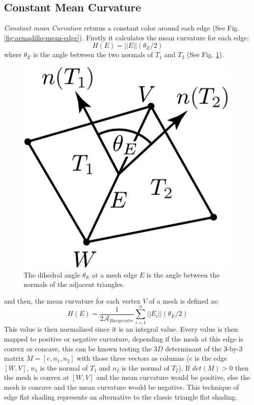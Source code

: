 \subsection{Constant Mean Curvature}
\textit{Constant mean Curvature} returns a constant color around each edge (See Fig. \ref{fig:armadillo-mean-edge}). Firstly it calculates the mean curvature for each edge:
$$H(E) = || E|| (\theta_E /2)$$
where $\theta_E$ is the angle between the two normals of $T_1$ and $T_2$ (See Fig. \ref{fig:mean-edge}).
\begin{figure}[!h]
    \centering
    \includegraphics[scale=0.6]{images/mean-edge-theta.png}
    \caption{The dihedral angle $\theta_E$ at a mesh edge $E$ is the angle between the normals of the adjacent triangles. \cite{geometryprocessing}}\label{fig:mean-edge}
\end{figure}
and then, the mean curvature for each vertex $V$ of a mesh is defined as:
$$H(E) = \frac{1}{2\mathcal{A}_{Barycentre}} \sum_{i = 1}^n ||E_i||(\theta_E/2)$$
This value is then normalized since it is an integral value. Every value is then mapped to positive or negative curvature, depending if the mesh at this edge is convex or concave, this can be known testing the $3D$ determinant of the 3-by-3 matrix $M = [e, n_1, n_2]$ with those three vectors as
columns ($e$ is the edge $[W, V]$, $n_1$ is the normal of $T_1$ and $n_2$ is the normal of $T_2$). If $det(M) > 0$ then the mesh is convex at $[W, V]$ and the mean curvature would be positive, else the mesh is concave and the mean curvature would be negative. This technique of edge flat shading represents an alternative to the classic triangle flat shading.

